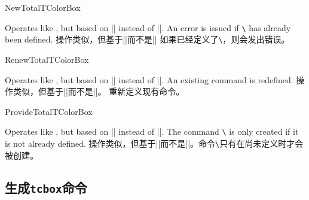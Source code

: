 \begin{docCommand}{NewTotalTColorBox}{}
\begin{stripedbox}
Operates like , but based on |\NewDocumentCommand| instead of |\DeclareDocumentCommand|.
An error is issued if \texttt{\textbackslash} has already been defined.
\tcblower
操作类似，但基于|\NewDocumentCommand|而不是|\DeclareDocumentCommand|
如果已经定义了\texttt{\textbackslash}，则会发出错误。
\end{stripedbox}
\end{docCommand}

\begin{docCommand}{RenewTotalTColorBox}{}
\begin{stripedbox}
Operates like , but based on |\RenewDocumentCommand| instead of |\DeclareDocumentCommand|.
An existing command is redefined.
\tcblower
操作类似，但基于|\RenewDocumentCommand|而不是|\DeclareDocumentCommand|。
重新定义现有命令。
\end{stripedbox}
\end{docCommand}

\begin{docCommand}{ProvideTotalTColorBox}{}
\begin{stripedbox}
Operates like , but based on |\ProvideDocumentCommand| instead of |\DeclareDocumentCommand|.
The command \texttt{\textbackslash} is only created if it is not already defined.
\tcblower
操作类似，但基于|\ProvideDocumentCommand|而不是|\DeclareDocumentCommand|。命令\texttt{\textbackslash}只有在尚未定义时才会被创建。
\end{stripedbox}  
\end{docCommand}

\subsection{生成\texttt{tcbox}命令}\label{subsec:xparse_tcbox}

